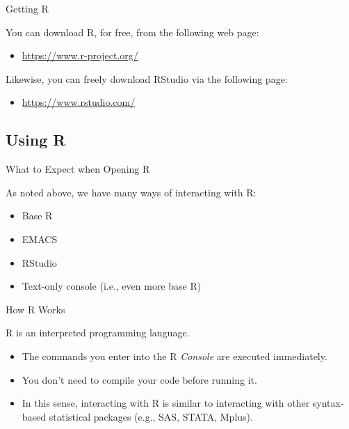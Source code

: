 \documentclass[10pt]{beamer}
\begin{document}

\begin{frame}{Getting R}

  You can download R, for free, from the following web page:
  \va
  \begin{itemize}
  \item \url{https://www.r-project.org/}
  \end{itemize}
  \va
  Likewise, you can freely download RStudio via the following page:
  \va
  \begin{itemize}
  \item \url{https://www.rstudio.com/}
  \end{itemize}

\end{frame}


\subsection{Using R}


\begin{frame}{What to Expect when Opening R}

As noted above, we have many ways of interacting with R:
  \vb
  \begin{itemize}
  \item Base R
    \vb
  \item EMACS
    \vb
  \item RStudio
    \vb
  \item Text-only console (i.e., even more base R)
  \end{itemize}

\end{frame}


\begin{frame}{How R Works}

  R is an interpreted programming language.
  \vb
  \begin{itemize}
  \item The commands you enter into the R \emph{Console} are executed 
    immediately.
    \vc
  \item You don't need to compile your code before running it.
    \vc
  \item In this sense, interacting with R is similar to interacting with other
    syntax-based statistical packages (e.g., SAS, STATA, Mplus).
  \end{itemize}

\end{frame}
\end{document}
